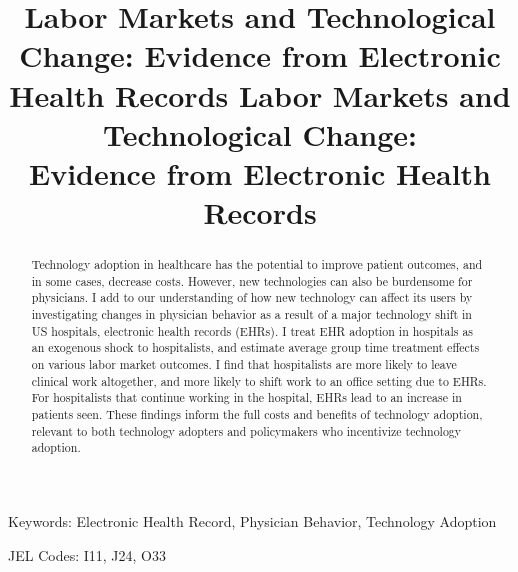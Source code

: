 \documentclass[12pt]{article}
\title{Labor Markets and Technological Change: Evidence from Electronic Health Records}
\begin{document}
\linespread{1.2}\title{\vspace{-0.5in} Labor Markets and Technological Change: \\ \Large Evidence from Electronic Health Records} 
	
	
	
	\maketitle
	
	\vspace{-0.2in}
	
	\singlespacing\maketitle

\begin{abstract}\small
    Technology adoption in healthcare has the potential to improve patient outcomes, and in some cases, decrease costs. However, new technologies can also be burdensome for physicians. I add to our understanding of how new technology can affect its users by investigating changes in physician behavior as a result of a major technology shift in US hospitals, electronic health records (EHRs). I treat EHR adoption in hospitals as an exogenous shock to hospitalists, and estimate average group time treatment effects on various labor market outcomes. I find that hospitalists are more likely to leave clinical work altogether, and more likely to shift work to an office setting due to EHRs. For hospitalists that continue working in the hospital, EHRs lead to an increase in patients seen. These findings inform the full costs and benefits of technology adoption, relevant to both technology adopters and policymakers who incentivize technology adoption.
\end{abstract}

\vspace{3in}
	
	\noindent Keywords: Electronic Health Record, Physician Behavior, Technology Adoption

    \vspace{2mm}
	
	\noindent JEL Codes: I11, J24, O33
\end{document}
